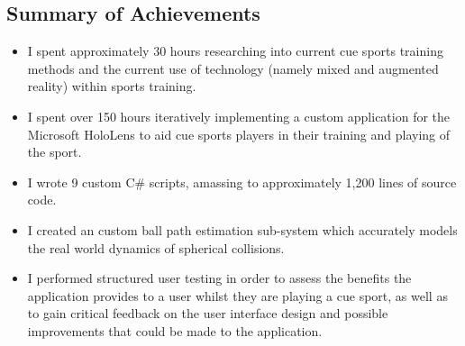 \documentclass[ %
                author={Finn Alexander Wilkinson},
                supervisor={Dr. Andrew Calway},
                degree={MEng},
                title={\centering A Mixed Reality Aim Assistant for Pool and Snooker},
                subtitle={},
                type={Enterprise},
                year={2021} ]{dissertation}
\begin{document}
\subsection*{Summary of Achievements}
\begin{itemize}
    \item I spent approximately 30 hours researching into current cue sports training methods and the current use of technology (namely mixed and augmented reality) within sports training. 
    \item I spent over 150 hours iteratively implementing a custom application for the Microsoft HoloLens to aid cue sports players in their training and playing of the sport. 
    \item I wrote 9 custom C\# scripts, amassing to approximately 1,200 lines of source code.
    \item I created an custom ball path estimation sub-system which accurately models the real world dynamics of spherical collisions.
    \item I performed structured user testing in order to assess the benefits the application provides to a user whilst they are playing a cue sport, as well as to gain critical feedback on the user interface design and possible improvements that could be made to the application.
\end{itemize}

\end{document}
